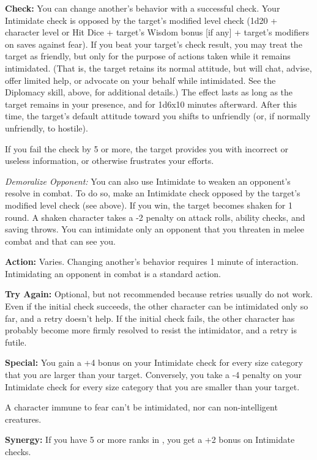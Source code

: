 
\textbf{Check:} You can change another's behavior with a successful check. Your Intimidate check is opposed by the target's modified level check (1d20 + character level or Hit Dice + target's Wisdom bonus [if any] + target's modifiers on saves against fear). If you beat your target's check result, you may treat the target as friendly, but only for the purpose of actions taken while it remains intimidated. (That is, the target retains its normal attitude, but will chat, advise, offer limited help, or advocate on your behalf while intimidated. See the Diplomacy skill, above, for additional details.) The effect lasts as long as the target remains in your presence, and for 1d6x10 minutes afterward. After this time, the target's default attitude toward you shifts to unfriendly (or, if normally unfriendly, to hostile).

If you fail the check by 5 or more, the target provides you with incorrect or useless information, or otherwise frustrates your efforts.

\textit{Demoralize Opponent:} You can also use Intimidate to weaken an opponent's resolve in combat. To do so, make an Intimidate check opposed by the target's modified level check (see above). If you win, the target becomes shaken for 1 round. A shaken character takes a -2 penalty on attack rolls, ability checks, and saving throws. You can intimidate only an opponent that you threaten in melee combat and that can see you.

\textbf{Action:} Varies. Changing another's behavior requires 1 minute of interaction. Intimidating an opponent in combat is a standard action.

\textbf{Try Again:} Optional, but not recommended because retries usually do not work. Even if the initial check succeeds, the other character can be intimidated only so far, and a retry doesn't help. If the initial check fails, the other character has probably become more firmly resolved to resist the intimidator, and a retry is futile.

\textbf{Special:} You gain a +4 bonus on your Intimidate check for every size category that you are larger than your target. Conversely, you take a -4 penalty on your Intimidate check for every size category that you are smaller than your target.

A character immune to fear can't be intimidated, nor can non-intelligent creatures.

\textbf{Synergy:} If you have 5 or more ranks in , you get a +2 bonus on Intimidate checks.